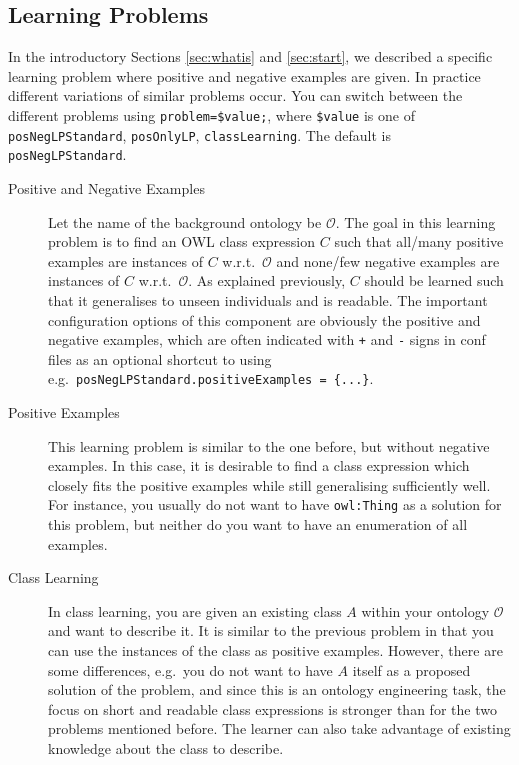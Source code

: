 \documentclass[a4paper,12pt]{scrartcl}
\begin{document}
\subsection{Learning Problems}

In the introductory Sections \ref{sec:whatis} and \ref{sec:start}, we described a specific learning problem where positive and negative examples are given. In practice different variations of similar problems occur. You can switch between the different problems using \verb|problem=$value;|, where \verb|$value| is one of \verb|posNegLPStandard|, \verb|posOnlyLP|, \verb|classLearning|. The default is \verb|posNegLPStandard|.

\begin{description}
 \item[Positive and Negative Examples] Let the name of the background ontology be $\mathcal{O}$. The goal in this learning problem is to find an OWL class expression $C$ such that all/many positive examples are instances of $C$ w.r.t.~$\mathcal{O}$ and none/few negative examples are instances of $C$ w.r.t.~$\mathcal{O}$. As explained previously, $C$ should be learned such that it generalises to unseen individuals and is readable. The important configuration options of this component are obviously the positive and negative examples, which are often indicated with \verb|+| and \verb|-| signs in conf files as an optional shortcut to using e.g.~\verb|posNegLPStandard.positiveExamples = {...}|.
 \item[Positive Examples] This learning problem is similar to the one before, but without negative examples. In this case, it is desirable to find a class expression which closely fits the positive examples while still generalising sufficiently well. For instance, you usually do not want to have \verb|owl:Thing| as a solution for this problem, but neither do you want to have an enumeration of all examples.
 \item[Class Learning] In class learning, you are given an existing class $A$ within your ontology $\mathcal{O}$ and want to describe it. It is similar to the previous problem in that you can use the instances of the class as positive examples. However, there are some differences, e.g.~you do not want to have $A$ itself as a proposed solution of the problem, and since this is an ontology engineering task, the focus on short and readable class expressions is stronger than for the two problems mentioned before. The learner can also take advantage of existing knowledge about the class to describe.
\end{description}
\end{document}
